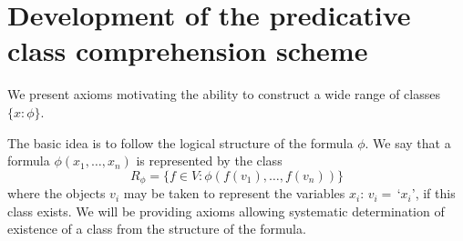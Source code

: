 \documentclass[12pt]{article}
\begin{document}
\section{Development of the predicative class comprehension scheme}

We present axioms motivating the ability to construct a wide range of classes $\{x:\phi\}$.

The basic idea is to follow the logical structure of the formula $\phi$.  We say that a formula $\phi(x_1,\ldots,x_n)$ is represented by the class
$$R_\phi = \{f\in V:\phi(f(v_1),\ldots,f(v_n))\}$$ where the objects $v_i$ may be taken to represent the variables $x_i$:  $v_i =\, $`$x_i$', if this class exists.
We will be providing axioms allowing systematic determination of existence of a class from the structure of the formula.
\end{document}
